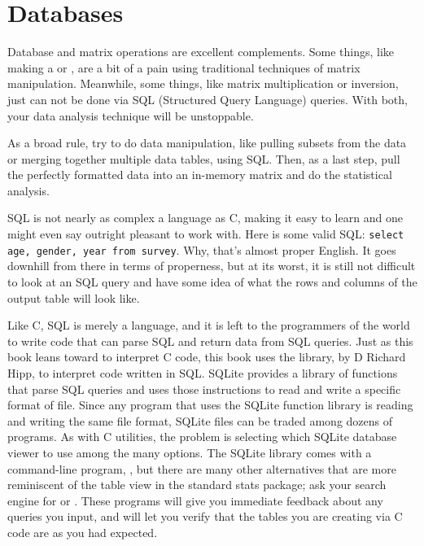 \chapter{Databases} \label{sql}
\setsql %


Database and matrix operations are excellent
complements. Some things, like making a  or , are a bit of a
pain using traditional techniques of matrix manipulation. Meanwhile,
some things, like matrix multiplication or inversion, just can not be done via SQL (Structured Query Language)
queries. With both, your data analysis technique will be unstoppable.

As a broad rule, try to do data manipulation, like pulling subsets
from the data or merging together multiple data tables, using SQL. Then,
as a last step, pull the perfectly formatted data into an in-memory matrix and
do the statistical analysis. 

SQL is not nearly as complex a language as C, making it easy to learn and
one might even say outright pleasant to work with. Here is some valid SQL:
{\tt select age, gender, year from survey}. Why, that's almost proper
English. It goes downhill from there in terms of properness, but at its
worst, it is still not difficult to look at an SQL query and have some
idea of what the rows and columns of the output table will look like.

Like C, SQL is merely a language, and it is left to the programmers of
the world to write code that can parse SQL and return data from SQL
queries. Just as this book leans toward  to interpret C code,
this book uses the  library, by D Richard Hipp, to interpret
code written in SQL. SQLite provides a library of functions that parse
SQL queries and uses those instructions to read and write a specific
format of file. Since any program that uses the SQLite function library
is reading and writing the same file format, SQLite files can be traded
among dozens of programs. As with C utilities, the problem is selecting
which SQLite database viewer to use among the many options. The SQLite
library comes with a command-line program, , but there
are many other alternatives that are more reminiscent of the table view
in the standard stats package; ask your search engine for  or . These programs will give you immediate
feedback about any queries you input, and will let you verify that the
tables you are creating via C code are as you had expected.

